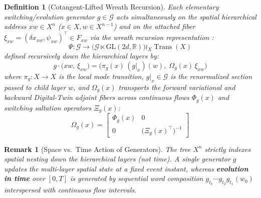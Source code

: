 \documentclass[11pt]{article}
\newtheorem{definition}{Definition}
\newtheorem{remark}{Remark}
\begin{document}
\begin{definition}[Cotangent-Lifted Wreath Recursion]
Each elementary switching/evolution generator $g \in \mathcal{G}$ acts simultaneously on the spatial hierarchical address $xw \in X^n$ ($x \in X, w \in X^{n-1}$) and on the attached fiber $\xi_{xw} = (\delta x_{xw}, \psi_{xw})^\top \in F_{xw}$ via the wreath recursion representation \cite{Nekrashevych2005}:
\begin{equation}
\Psi : \mathcal{G} \longrightarrow \big(\mathcal{G} \ltimes \mathrm{GL}(2d, \mathbb{R})\big) \wr_X \operatorname{Trans}(X)
\end{equation}
defined recursively down the hierarchical layers by:
\begin{equation}
g \cdot \big(xw,\, \xi_{xw}\big) = \Big( \pi_g(x)\,(g|_x)(w),\; \Omega_g(x)\, \xi_{xw} \Big)
\end{equation}
where $\pi_g : X \to X$ is the local mode transition, $g|_x \in \mathcal{G}$ is the renormalized section passed to child layer $w$, and $\Omega_g(x)$ transports the forward variational and backward Digital-Twin adjoint fibers across continuous flows $\Phi_g(x)$ and switching saltation operators $\Xi_g(x)$:
\begin{equation}
\Omega_g(x) =
\begin{bmatrix}
\Phi_g(x) & 0 \\
0 & \big(\Xi_g(x)^\top\big)^{-1}
\end{bmatrix}
\end{equation}
\end{definition}

\begin{remark}[Space vs.\ Time Action of Generators]
The tree $X^n$ strictly indexes spatial nesting down the hierarchical layers (not time). A single generator $g$ updates the multi-layer spatial state at a fixed event instant, whereas \textbf{evolution in time} over $[0, T]$ is generated by sequential word composition $g_{t_k} \cdots g_{t_2} g_{t_1}(w_0)$ interspersed with continuous flow intervals.
\end{remark}
\end{document}
